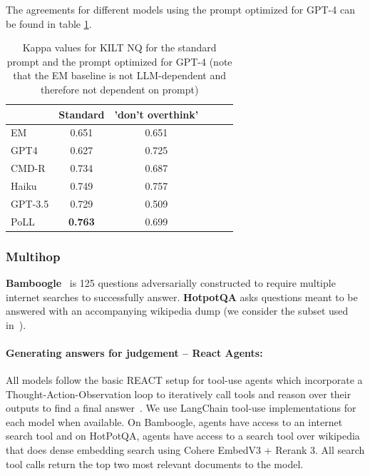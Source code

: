 \documentclass[11pt]{article}
\newcommand{\acronym}{PoLL\ }
\begin{document}
The agreements for different models using the prompt optimized for GPT-4 can be found in table \ref{tab:standard_vs_gpt4_prompt}.

\begin{table}[ht]
\centering

\begin{tabular}{lccccc}
\toprule
 & Standard & 'don't overthink' \\
\midrule
EM & 0.651 &  0.651 \\
GPT4 & 0.627 & 0.725 \\
\midrule
CMD-R & 0.734 & 0.687 \\
Haiku & 0.749 & 0.757\\
GPT-3.5 & 0.729 & 0.509\\
\acronym & \textbf{0.763} & 0.699\\
\bottomrule
\end{tabular}

\caption{Kappa values for KILT NQ for the standard prompt and the prompt optimized for GPT-4 (note that the EM baseline is not LLM-dependent and therefore not dependent on prompt)}
\label{tab:standard_vs_gpt4_prompt}

\end{table}




\subsubsection{Multihop}
\textbf{Bamboogle}~\citep{press2023measuring} is 125 questions adversarially constructed to require multiple internet searches to successfully answer. \textbf{HotpotQA} asks questions meant to be answered with an accompanying wikipedia dump (we consider the subset used in~\citep{shinn2024reflexion}).

\label{sec:appendex_react}
\paragraph{Generating answers for judgement -- React Agents:}
All models follow the basic REACT setup for tool-use agents which incorporate a Thought-Action-Observation loop to iteratively call tools and reason over their outputs to find a final answer~\citep{yao2022react}. We use LangChain tool-use implementations for each model when available. On Bamboogle, agents have access to an internet search tool and on HotPotQA, agents have access to a search tool over wikipedia that does dense embedding search using Cohere EmbedV3 + Rerank 3. All search tool calls return the top two most relevant documents to the model.
\end{document}
